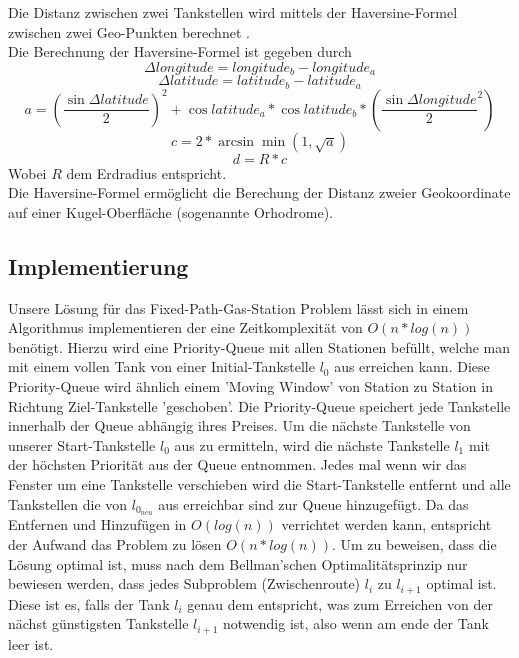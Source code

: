\documentclass[
ngerman          %
,a4paper          %
,11pt
,pdftex
]{report}
\begin{document}
Die Distanz zwischen zwei Tankstellen wird mittels der Haversine-Formel zwischen zwei Geo-Punkten berechnet \cite{haversine}.\\
Die Berechnung der Haversine-Formel ist gegeben durch
$$ \Delta longitude = longitude_b - longitude_a $$
$$ \Delta latitude = latitude_b - latitude_a $$
$$ a = (\frac{\sin \Delta latitude}{2})^2 + \cos latitude_a * \cos latitude_b * (\frac{\sin \Delta longitude}{2}^2)$$
$$ c = 2 * \arcsin \min(1,\sqrt{a})$$
$$ d = R * c $$
Wobei $R$ dem Erdradius entspricht.\\
Die Haversine-Formel ermöglicht die Berechung der Distanz zweier Geokoordinate auf einer Kugel-Oberfläche (sogenannte Orhodrome).

\subsection{Implementierung}

Unsere Lösung für das Fixed-Path-Gas-Station Problem lässt sich in einem Algorithmus implementieren der eine Zeitkomplexität von $O(n*log (n))$ benötigt\cite{fixedgas}. Hierzu wird eine Priority-Queue mit allen Stationen befüllt, welche man mit einem vollen Tank von einer Initial-Tankstelle $l_0$ aus erreichen kann.
Diese Priority-Queue wird ähnlich einem 'Moving Window' von Station zu Station in Richtung Ziel-Tankstelle 'geschoben'.
Die Priority-Queue speichert jede Tankstelle innerhalb der Queue abhängig ihres Preises.
Um die nächste Tankstelle von unserer Start-Tankstelle $l_0$ aus zu ermitteln, wird die nächste Tankstelle $l_1$ mit der höchsten Priorität aus der Queue entnommen.
Jedes mal wenn wir das Fenster um eine Tankstelle verschieben wird die Start-Tankstelle entfernt und alle Tankstellen die von $l_{0_{neu}}$ aus erreichbar sind zur Queue hinzugefügt. Da das Entfernen und Hinzufügen in $O(log (n))$ verrichtet werden kann\cite{queue}, entspricht der Aufwand das Problem zu lösen $O(n*log (n))$. Um zu beweisen, dass die Lösung optimal ist, muss nach dem Bellman'schen Optimalitätsprinzip\cite{bellman} nur bewiesen werden, dass jedes Subproblem (Zwischenroute) $l_i$ zu $l_{i+1}$ optimal ist. Diese ist es, falls der Tank $l_i$ genau dem entspricht, was zum Erreichen von der nächst günstigsten Tankstelle $l_{i+1}$ notwendig ist, also wenn am ende der Tank leer ist. 
\end{document}
